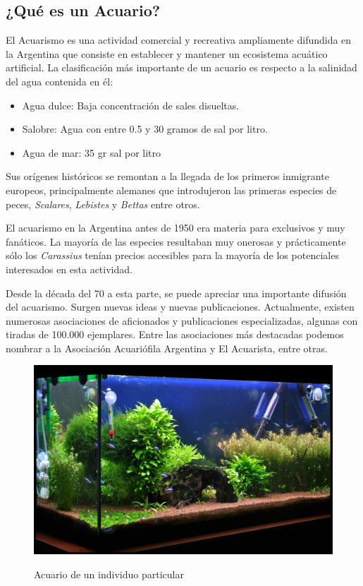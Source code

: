 \subsection{¿Qué es un Acuario?}
\label{sec:acuario}

El Acuarismo es una actividad comercial y recreativa ampliamente difundida en la Argentina que consiste en establecer y mantener un ecosistema acuático artificial. La clasificación más importante de un acuario es respecto a la salinidad del agua contenida en él:

\begin{itemize}
\item Agua dulce: Baja concentración de sales disueltas.
\item Salobre: Agua con entre 0.5 y 30 gramos de sal por litro.
\item Agua de mar: 35 gr sal por litro%
\end{itemize}

Sus orígenes históricos se remontan a la llegada de los primeros inmigrante europeos, principalmente alemanes que introdujeron las primeras especies de peces, \textit{Scalares}, \textit{Lebistes} y \textit{Bettas} entre otros.

El acuarismo en la Argentina antes de 1950 era materia para exclusivos y muy fanáticos. La mayoría de las especies resultaban muy onerosas y prácticamente sólo los \textit{Carassius} tenían precios accesibles para la mayoría de los potenciales interesados en esta actividad.

Desde la década del 70 a esta parte, se puede apreciar una importante difusión del acuarismo. Surgen nuevas ideas y nuevas publicaciones.  Actualmente, existen numerosas asociaciones de aficionados y publicaciones especializadas, algunas con tiradas de 100.000 ejemplares.  Entre las asociaciones más destacadas podemos nombrar a la Asociación Acuariófila Argentina y El Acuarista, entre otras.


\begin{figure}[]
	\centering
    \includegraphics[width=.5\textwidth]{./Figures/acuarioHobby3.jpg}
	\label{fig:acuarioHobby}
	\caption{Acuario de un individuo particular}
\end{figure}       

